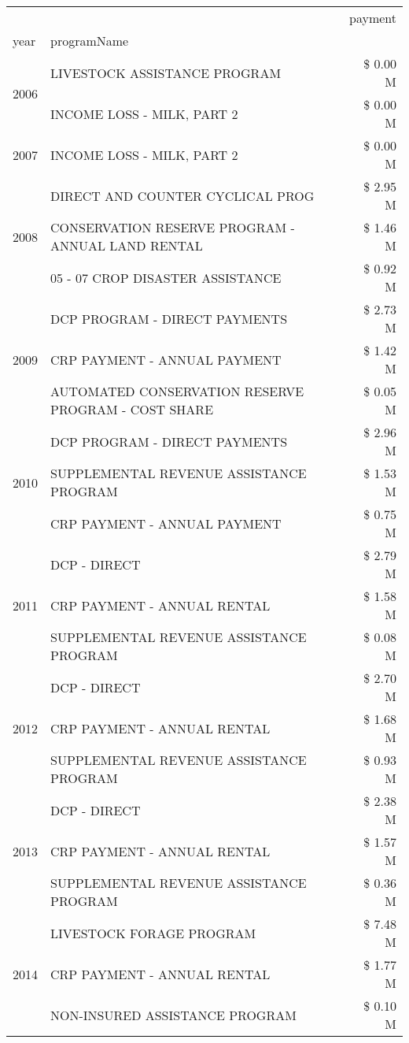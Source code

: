 \begin{tabular}{llr}
\toprule
 &  & payment \\
year & programName &  \\
\midrule
\multirow[t]{2}{*}{2006} & LIVESTOCK ASSISTANCE PROGRAM & \$ 0.00 M \\
 & INCOME LOSS - MILK, PART 2 & \$ 0.00 M \\
\cline{1-3}
2007 & INCOME LOSS - MILK, PART 2 & \$ 0.00 M \\
\cline{1-3}
\multirow[t]{3}{*}{2008} & DIRECT AND COUNTER CYCLICAL PROG & \$ 2.95 M \\
 & CONSERVATION RESERVE PROGRAM - ANNUAL LAND RENTAL & \$ 1.46 M \\
 & 05 - 07 CROP DISASTER ASSISTANCE & \$ 0.92 M \\
\cline{1-3}
\multirow[t]{3}{*}{2009} & DCP PROGRAM - DIRECT PAYMENTS & \$ 2.73 M \\
 & CRP PAYMENT - ANNUAL PAYMENT & \$ 1.42 M \\
 & AUTOMATED CONSERVATION RESERVE PROGRAM - COST SHARE & \$ 0.05 M \\
\cline{1-3}
\multirow[t]{3}{*}{2010} & DCP PROGRAM - DIRECT PAYMENTS & \$ 2.96 M \\
 & SUPPLEMENTAL REVENUE ASSISTANCE PROGRAM & \$ 1.53 M \\
 & CRP PAYMENT - ANNUAL PAYMENT & \$ 0.75 M \\
\cline{1-3}
\multirow[t]{3}{*}{2011} & DCP - DIRECT & \$ 2.79 M \\
 & CRP PAYMENT - ANNUAL RENTAL & \$ 1.58 M \\
 & SUPPLEMENTAL REVENUE ASSISTANCE PROGRAM & \$ 0.08 M \\
\cline{1-3}
\multirow[t]{3}{*}{2012} & DCP - DIRECT & \$ 2.70 M \\
 & CRP PAYMENT - ANNUAL RENTAL & \$ 1.68 M \\
 & SUPPLEMENTAL REVENUE ASSISTANCE PROGRAM & \$ 0.93 M \\
\cline{1-3}
\multirow[t]{3}{*}{2013} & DCP - DIRECT & \$ 2.38 M \\
 & CRP PAYMENT - ANNUAL RENTAL & \$ 1.57 M \\
 & SUPPLEMENTAL REVENUE ASSISTANCE PROGRAM & \$ 0.36 M \\
\cline{1-3}
\multirow[t]{3}{*}{2014} & LIVESTOCK FORAGE PROGRAM & \$ 7.48 M \\
 & CRP PAYMENT - ANNUAL RENTAL & \$ 1.77 M \\
 & NON-INSURED ASSISTANCE PROGRAM & \$ 0.10 M \\

\end{tabular}
